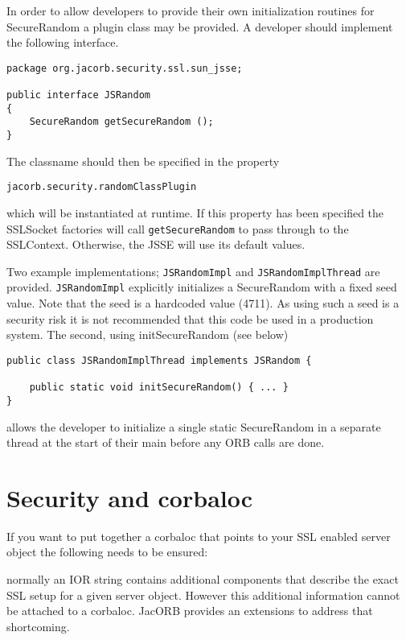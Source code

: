 In order to allow developers to provide their own initialization
routines for SecureRandom a plugin class may be provided. A developer
should implement the following interface.

\begin{small}
\begin{verbatim}
package org.jacorb.security.ssl.sun_jsse;

public interface JSRandom
{
    SecureRandom getSecureRandom ();
}
\end{verbatim}
\end{small}

The classname should then be specified in the property

\begin{verbatim}
jacorb.security.randomClassPlugin
\end{verbatim}
 which will be instantiated at runtime. If this property has been
specified the SSLSocket factories will call {\tt getSecureRandom}
to pass through to the SSLContext. Otherwise, the JSSE will use its
default values.

Two example implementations; {\tt JSRandomImpl} and {\tt JSRandomImplThread}
are provided. {\tt JSRandomImpl} explicitly initializes a SecureRandom with
a fixed seed value. Note that the seed is a hardcoded value (4711). As using
such a seed is a security risk it is not recommended that this code be used
in a production system. The second, using initSecureRandom (see below)

\begin{small}
\begin{verbatim}
public class JSRandomImplThread implements JSRandom {

    public static void initSecureRandom() { ... }
}
\end{verbatim}
\end{small}

allows the developer to initialize a single static SecureRandom
in a separate thread at the start of their main before any ORB
calls are done.

\section{Security and corbaloc}

If you want to put together a corbaloc that points to your SSL enabled server object the following 
needs to be ensured:

normally an IOR string contains additional components that describe the exact SSL setup for a given 
server object. However this additional information cannot be attached to a corbaloc.
JacORB provides an extensions to address that shortcoming.

